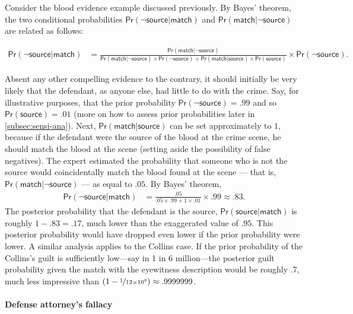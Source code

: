 \documentclass{article}
\newcommand{\pr}{\mathsf{Pr}}
\begin{document}
Consider the blood evidence example discussed previously. By Bayes' theorem, the two conditional probabilities $\pr(\neg \textsf{source} \vert \textsf{match})$ and $\pr(\textsf{match} \vert \neg \textsf{source})$ are related as follows:
\begin{small}
\begin{align*} \pr(\neg \textsf{source} \vert \textsf{match}) & =  \frac{\pr(\textsf{match} \vert \neg \textsf{source})}{ \pr(\textsf{match} \vert \neg \textsf{source})\times \pr(\neg \textsf{source})+ \pr(\textsf{match} \vert \textsf{source})\times \pr(\textsf{source})} \times \pr(\neg \textsf{source}).\end{align*}
\end{small}
Absent any  other compelling evidence to the contrary, it should initially be very likely that the defendant, as anyone else, had little to do with the crime. Say, for illustrative purposes, that the prior probability  $\pr(\neg \textsf{source})= .99$ and  so $\pr(\textsf{source})=.01$ (more on how to assess prior probabilities later in \ref{subsec:sensi-ana}).
Next, $\pr(\textsf{match} \vert \textsf{source})$ can be set approximately  to $1$, because if the defendant were the source of the blood at the crime scene, he should match the blood at the scene (setting aside the possibility of false negatives). The expert estimated  the probability that someone who is not the source would coincidentally match the blood found at the scene --- that is, $\pr(\textsf{match} \vert \neg \textsf{source})$ --- as equal to $.05$. %
By Bayes' theorem,
\begin{align*} \pr(\neg \textsf{source} \vert \textsf{match}) & = \frac{.05}{ .05 \times .99+ 1 \times .01} \times .99 \approx .83. \end{align*}
\noindent The posterior probability that  the defendant is the source, $\pr(\textsf{source}\vert \textsf{match})$ is  roughly $1-.83=.17$, much lower than the exaggerated value of $.95$. This posterior probability would have dropped even lower if the prior probability were lower. 
A similar analysis applies to the  Collins case. If the prior probability of the Collins's guilt is sufficiently low---say in 1 in 6 million---the posterior guilt probability given  the match with the eyewitness description would be roughly .7, much less impressive than $(1-\nicefrac{1}{12\times 10^6})\approx .9999999$. %





\paragraph{Defense attorney's fallacy} 
\end{document}
